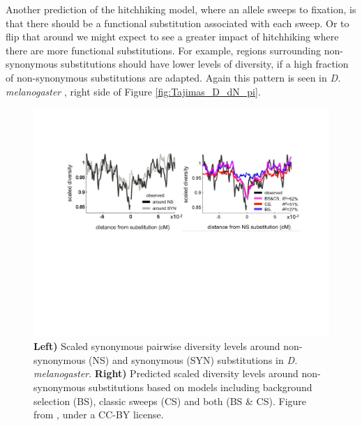 Another prediction of the hitchhiking model, where an allele sweeps to
fixation, is that there should be a functional substitution associated with each
sweep. Or to flip that around we might expect to see a greater impact
of hitchhiking where there are more functional substitutions. 
For example, regions surrounding non-synonymous substitutions should have lower levels of
diversity, if a high fraction of non-synonymous substitutions are adapted. Again this pattern is seen in \textit{D. melanogaster}
\citep{Andolfatto:07, Macpherson:07,Sattath:11}, right side of
Figure \ref{fig:Tajimas_D_dN_pi}.

\begin{figure}
\begin{center}
\includegraphics[width=\textwidth]{Journal_figs/recom_selection/Elyashiv_around_subs/Elyashiv_around_subs.pdf}
\end{center}
\caption{ {\bf Left) }  Scaled synonymous pairwise diversity levels around non-synonymous
  (NS) and synonymous (SYN) substitutions in {\it
    D. melanogaster}. {\bf Right)} Predicted scaled diversity levels
  around non-synonymous substitutions based on models including
  background selection (BS), classic sweeps (CS) and both (BS \&
  CS). Figure from \citet{elyashiv2014genomic}, under a CC-BY license.} \label{fig:Elyashiv_around_subs}
\end{figure}

